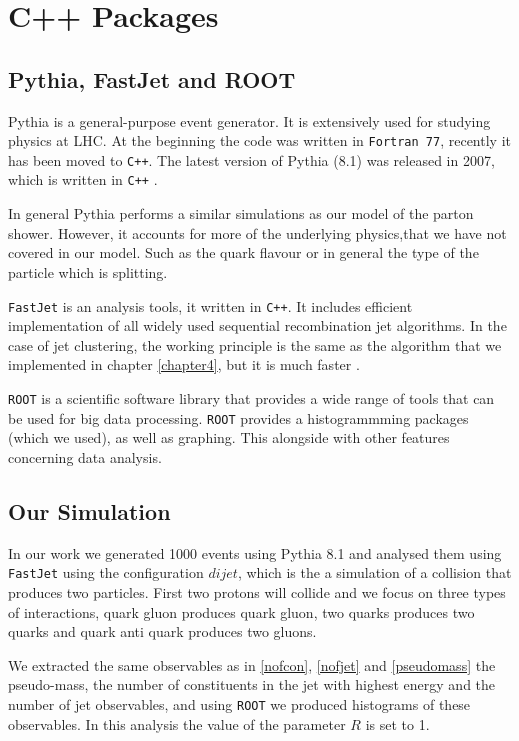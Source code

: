 \chapter{C++ Packages}
\section{Pythia, FastJet and ROOT}
Pythia is a general-purpose event generator. It is extensively used for studying physics at LHC. At the beginning the code was written in \verb+Fortran 77+, recently it has been moved to \verb!C++!. The latest version of Pythia (8.1) was released in 2007, which is written in \verb!C++!  \citep{Buckley:2011ms}.

In general Pythia performs a similar simulations as our model of the parton shower.
However, it accounts for more of the underlying physics,that we have not covered in our model. Such  as the quark flavour or in general the type of the particle which is splitting.  


\verb+FastJet+ is an analysis tools, it written in \verb!C++!. It includes efficient implementation of all widely used sequential recombination jet algorithms. In the case of jet clustering, the working principle is the same as the algorithm that we implemented in chapter \ref{chapter4},
but it is much faster \citep{Buckley:2011ms}. 

\verb+ROOT+ is a scientific software library that provides a wide range of tools that can be used for big data processing. \verb+ROOT+ provides a histogrammming packages (which we used), as well as graphing. This alongside with other features concerning data analysis.  
\section{Our Simulation}
In our work we generated 1000 events using Pythia 8.1 and analysed them using \verb+FastJet+ using the configuration $dijet$, which is the a simulation of a collision that produces two particles. First two protons will collide and we focus on three types of  interactions, quark gluon produces quark gluon, two quarks produces two quarks and quark anti quark produces two gluons.    

We extracted the same  observables as in \ref{nofcon}, \ref{nofjet} and \ref{pseudomass}  the pseudo-mass, the number of constituents in the jet with highest energy and the number of jet observables, and using \verb+ROOT+ we produced histograms of these observables. In this analysis the value of the parameter $R$ is set to 1.

